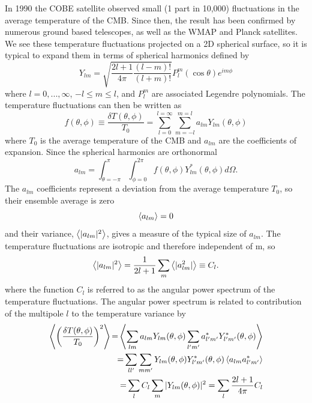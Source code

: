 In 1990 the COBE satellite observed small (1 part in 10,000) fluctuations in the average temperature of the CMB.   Since then, the result has been confirmed by numerous ground based telescopes, as well as the WMAP and Planck satellites.  We see these temperature fluctuations projected on a 2D spherical surface, so it is typical to expand them in terms of spherical harmonics defined by
\begin{equation}\label{Ylm}
Y_{lm}=\sqrt{\frac{2l+1}{4\pi} \frac{(l-m)!}{(l+m)!}}P_l^m(\cos\theta)e^{im\phi}
\end{equation}
where $l=0,...,\infty$, $-l \le m \le l$, and $P_l^m$ are associated Legendre polynomials.  The temperature fluctuations can then be written as
\begin{equation}\label{dTdT0}
f(\theta,\phi) \equiv \frac{\delta T(\theta,\phi)}{T_0} = \sum_{l=0}^{l=\infty} \sum_{m=-l}^{m=l} a_{lm} Y_{lm}(\theta,\phi)
\end{equation}
where $T_0$ is the average temperature of the CMB and $a_{lm}$ are the coefficients of expansion. Since the spherical harmonics are orthonormal
\begin{equation}\label{alm}
a_{lm} = \int_{\theta=-\pi}^{\pi}\int_{\phi=0}^{2\pi} f(\theta,\phi)Y_{lm}^*(\theta,\phi) d\Omega.
\end{equation}
The $a_{lm}$ coefficients represent a deviation from the average temperature  $T_0$, so their ensemble average is zero
\begin{equation}
\left< a_{lm} \right> = 0
\end{equation}
and their variance, $\left< |a_{lm}|^2 \right>$, gives a measure of the typical size of $a_{lm}$.  The temperature fluctuations are isotropic and therefore independent of m, so
\begin{equation}\label{alm_var2}
\left< |a_{lm}|^2 \right>=\frac{1}{2l+1} \sum_{m}\left< |a_{lm}^2| \right> \equiv C_l.
\end{equation}
where the function $C_l$ is referred to as the angular power spectrum of the temperature fluctuations.  The angular power spectrum is related to contribution of the multipole $l$ to the temperature variance by
\begin{align}\label{powerspec}
\left< \left(\frac{\delta T(\theta,\phi)}{T_0} \right)^2 \right> \begin{aligned} = \end{aligned} \left< \sum_{lm}a_{lm}Y_{lm}(\theta,\phi)\sum_{l'm'}a_{l'm'}^*Y_{l'm'}^*(\theta,\phi) \right> \nonumber \\
\begin{aligned} = \end{aligned} \sum_{ll'}\sum_{mm'}Y_{lm}(\theta,\phi)Y_{l'm'}^*(\theta,\phi)\left< a_{lm}a_{l'm'}^*  \right> \\
\begin{aligned} = \end{aligned} \sum_l C_l \sum_m |Y_{lm}(\theta,\phi)|^2 = \sum_l \frac{2l+1}{4\pi}C_l  \nonumber
\end{align}
